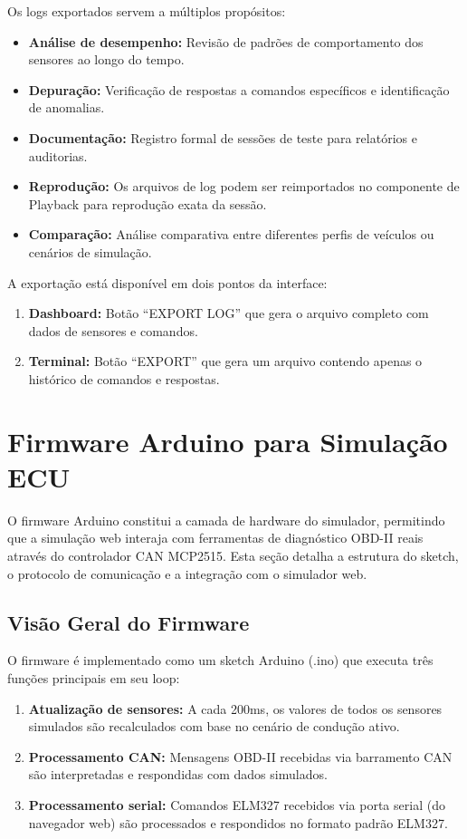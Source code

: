 Os logs exportados servem a múltiplos propósitos:

\begin{itemize}
    \item \textbf{Análise de desempenho:} Revisão de padrões de comportamento dos sensores ao longo do tempo.
    \item \textbf{Depuração:} Verificação de respostas a comandos específicos e identificação de anomalias.
    \item \textbf{Documentação:} Registro formal de sessões de teste para relatórios e auditorias.
    \item \textbf{Reprodução:} Os arquivos de log podem ser reimportados no componente de Playback para reprodução exata da sessão.
    \item \textbf{Comparação:} Análise comparativa entre diferentes perfis de veículos ou cenários de simulação.
\end{itemize}

A exportação está disponível em dois pontos da interface:
\begin{enumerate}
    \item \textbf{Dashboard:} Botão ``EXPORT LOG'' que gera o arquivo completo com dados de sensores e comandos.
    \item \textbf{Terminal:} Botão ``EXPORT'' que gera um arquivo contendo apenas o histórico de comandos e respostas.
\end{enumerate}

\section{Firmware Arduino para Simulação ECU}
\label{sec:firmware-arduino}

O firmware Arduino constitui a camada de hardware do simulador, permitindo que a simulação web interaja com ferramentas de diagnóstico OBD-II reais através do controlador CAN MCP2515. Esta seção detalha a estrutura do sketch, o protocolo de comunicação e a integração com o simulador web.

\subsection{Visão Geral do Firmware}

O firmware é implementado como um sketch Arduino (.ino) que executa três funções principais em seu loop:

\begin{enumerate}
    \item \textbf{Atualização de sensores:} A cada 200ms, os valores de todos os sensores simulados são recalculados com base no cenário de condução ativo.
    \item \textbf{Processamento CAN:} Mensagens OBD-II recebidas via barramento CAN são interpretadas e respondidas com dados simulados.
    \item \textbf{Processamento serial:} Comandos ELM327 recebidos via porta serial (do navegador web) são processados e respondidos no formato padrão ELM327.
\end{enumerate}

